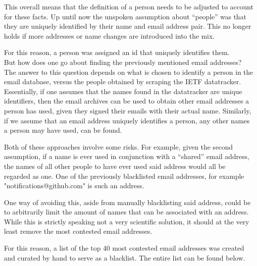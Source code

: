 \documentclass[a4paper,english]{report}
\begin{document}
This overall means that the definition of a person needs to be adjusted to account for these facts. Up until now the unspoken assumption about “people” was that they are uniquely identified by their name and email address pair. This no longer holds if more addresses or name changes are introduced into the mix.

For this reason, a person was assigned an id that uniquely identifies them.\\

But how does one go about finding the previously mentioned email addresses?
The answer to this question depends on what is chosen to identify a person in the email database, versus the people obtained by scraping the IETF datatracker. \\

Essentially, if one assumes that the names found in the datatracker are unique identifiers, then the email archives can be used to obtain other email addresses a person has used, given they signed their emails with their actual name.
Similarly, if we assume that an email address uniquely identifies a person, any other names a person may have used, can be found.

Both of these approaches involve some risks. For example, given the second assumption, if a name is ever used in conjunction with a “shared” email address, the names of all other people to have ever used said address would all be regarded as one. One of the previously blacklisted email addresses, for example "notifications@github.com" is such an address.

One way of avoiding this, aside from manually blacklisting said address, could be to arbitrarily limit the amount of names that can be associated with an address. While this is strictly speaking not a very scientific solution, it should at the very least remove the most contested email addresses.

For this reason, a list of the top 40 most contested email addresses was created and curated by hand to serve as a blacklist.    
The entire list can be found below.\\
\end{document}
